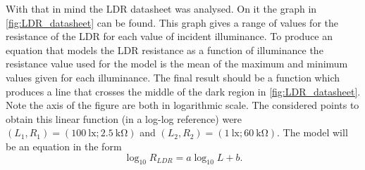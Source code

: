 With that in mind the LDR datasheet was analysed. On it the graph in \autoref{fig:LDR_datasheet} can be found. This graph gives a range of values for the resistance of the LDR for each value of incident illuminance. To produce an equation that models the LDR resistance as a function of illuminance the resistance value used for the model is the mean of the maximum and minimum values given for each illuminance. The final result should be a function which produces a line that crosses the middle of the dark region in \autoref{fig:LDR_datasheet}. Note the axis of the figure are both in logarithmic scale. The considered points to obtain this linear function (in a log-log reference) were $(L_1, R_1) = (\SI{100}{\lux}; \SI{2.5}{\kilo\ohm})$ and $(L_2, R_2) = (\SI{1}{\lux}; \SI{60}{\kilo\ohm})$. The model will be an equation in the form
\begin{equation} \label{eq:log-log_line}
    \log_{10} R_{LDR} = a \log_{10} L + b.
\end{equation}

